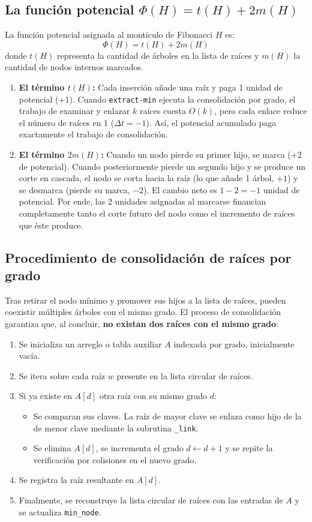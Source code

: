 \subsection{La función potencial \texorpdfstring{$\Phi(H) = t(H) + 2m(H)$}{Phi(H) = t(H) + 2m(H)}}
La función potencial asignada al montículo de Fibonacci $H$ es:
\begin{equation}
    \Phi(H) = t(H) + 2m(H)
\end{equation}
donde $t(H)$ representa la cantidad de árboles en la lista de raíces y $m(H)$ la cantidad de nodos internos marcados.
\begin{enumerate}
    \item \textbf{El término $t(H)$:} Cada inserción añade una raíz y paga 1 unidad de potencial (+1). Cuando \texttt{extract-min} ejecuta la consolidación por grado, el trabajo de examinar y enlazar $k$ raíces cuesta $O(k)$, pero cada enlace reduce el número de raíces en 1 ($\Delta t = -1$). Así, el potencial acumulado paga exactamente el trabajo de consolidación.
    \item \textbf{El término $2m(H)$:} Cuando un nodo pierde su primer hijo, se marca (+2 de potencial). Cuando posteriormente pierde un segundo hijo y se produce un corte en cascada, el nodo se corta hacia la raíz (lo que añade 1 árbol, $+1$) y se desmarca (pierde su marca, $-2$). El cambio neto es $1 - 2 = -1$ unidad de potencial. Por ende, las 2 unidades asignadas al marcarse financian completamente tanto el corte futuro del nodo como el incremento de raíces que éste produce.
\end{enumerate}

\subsection{Procedimiento de consolidación de raíces por grado}
Tras retirar el nodo mínimo y promover sus hijos a la lista de raíces, pueden coexistir múltiples árboles con el mismo grado. El proceso de consolidación garantiza que, al concluir, \textbf{no existan dos raíces con el mismo grado}:
\begin{enumerate}
    \item Se inicializa un arreglo o tabla auxiliar $A$ indexada por grado, inicialmente vacía.
    \item Se itera sobre cada raíz $w$ presente en la lista circular de raíces.
    \item Si ya existe en $A[d]$ otra raíz con su mismo grado $d$:
    \begin{itemize}
        \item Se comparan sus claves. La raíz de mayor clave se enlaza como hijo de la de menor clave mediante la subrutina \texttt{\_link}.
        \item Se elimina $A[d]$, se incrementa el grado $d \leftarrow d + 1$ y se repite la verificación por colisiones en el nuevo grado.
    \end{itemize}
    \item Se registra la raíz resultante en $A[d]$.
    \item Finalmente, se reconstruye la lista circular de raíces con las entradas de $A$ y se actualiza \texttt{min\_node}.
\end{enumerate}

